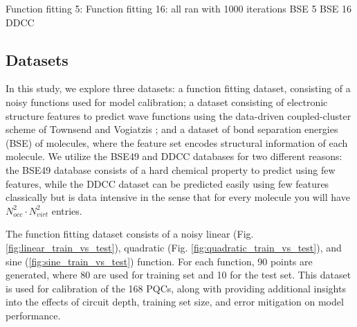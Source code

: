 \documentclass[journal=jacsat,manuscript=article]{achemso}
\begin{document}
Function fitting 5: 
Function fitting 16: all ran with 1000 iterations
BSE 5
BSE 16
DDCC

\subsection{Datasets}
In this study, we explore three datasets: a function fitting dataset, consisting of a noisy functions used for model calibration; a dataset consisting of electronic structure features to predict wave functions using the data-driven coupled-cluster scheme of Townsend and Vogiatzis \cite{townsend_data-driven_2019}; and a dataset of bond separation energies (BSE) of molecules, where the feature set encodes structural information of each molecule. 
We utilize the BSE49 and DDCC databases for two different reasons: the BSE49 database consists of a hard chemical property to predict using few features, while the DDCC dataset can be predicted easily using few features classically but is data intensive in the sense that for every molecule you will have $N_{occ}^{2}\cdot N_{virt}^{2}$ entries.

The function fitting dataset consists of a noisy linear (Fig. \ref{fig:linear_train_vs_test}), quadratic (Fig. \ref{fig:quadratic_train_vs_test}), and sine (\ref{fig:sine_train_vs_test}) function.  
For each function, 90 points are generated, where 80 are used for training set and 10 for the test set.
This dataset is used for calibration of the 168 PQCs, along with providing additional insights into the effects of circuit depth, training set size, and error mitigation on model performance.
\end{document}
